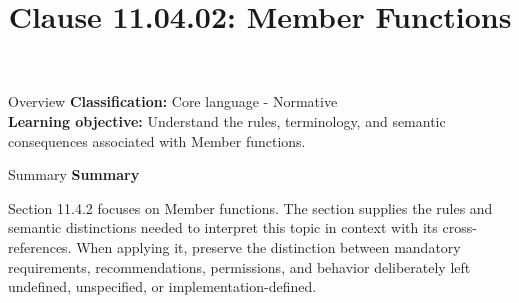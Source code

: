 \documentclass[10pt,letterpaper]{article}
\title{Clause 11.04.02: Member Functions}
\author{}
\date{}
\begin{document}
\maketitle
\begin{CornellOverviewBox}{Overview}
\textbf{Classification:} Core language - Normative\\[2pt]
\textbf{Learning objective:} Understand the rules, terminology, and semantic consequences associated with Member functions.
\end{CornellOverviewBox}\begin{CornellSummaryBox}{Summary}
{\sffamily\bfseries\color{Accent} Summary}\par\vspace{3pt}Section 11.4.2 focuses on Member functions. The section supplies the rules and semantic distinctions needed to interpret this topic in context with its cross-references. When applying it, preserve the distinction between mandatory requirements, recommendations, permissions, and behavior deliberately left undefined, unspecified, or implementation-defined.
\end{CornellSummaryBox}
\end{document}

